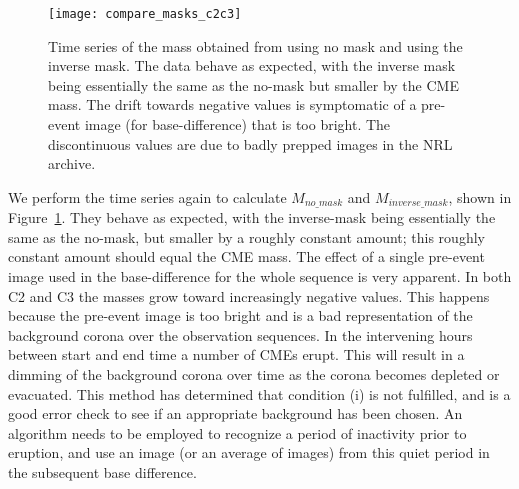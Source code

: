 \begin{figure}[t!]
\begin{center}
\texttt{[image: compare\_masks\_c2c3]}
\caption{Time series of the mass obtained from using no mask and using the inverse mask. The data behave as expected, with the inverse mask being essentially the same as the no-mask but smaller by the CME mass. The drift towards negative values is symptomatic of a pre-event image (for base-difference) that is too bright. The discontinuous values are due to badly prepped images in the NRL archive.}
\label{fig:comparison0}
\end{center}
\end{figure}
We perform the time series again to calculate $M_{no\_mask}$ and $M_{inverse\_mask}$, shown in Figure~\ref{fig:comparison0}. They behave as expected, with the inverse-mask being essentially the same as the no-mask, but smaller by a roughly constant amount; this roughly constant amount should equal the CME mass. The effect of a single pre-event image used in the base-difference for the whole sequence is very apparent. In both C2 and C3 the masses grow toward increasingly negative values. This happens because the pre-event image is too bright and is a bad representation of the background corona over the observation sequences. In the intervening hours between start and end time a number of CMEs erupt. This will result in a dimming of the background corona over time as the corona becomes depleted or evacuated. This method has determined that condition (i) is not fulfilled, and is a good error check to see if an appropriate background has been chosen. An algorithm needs to be employed to recognize a period of inactivity prior to eruption, and use an image (or an average of images) from this quiet period in the subsequent base difference.

